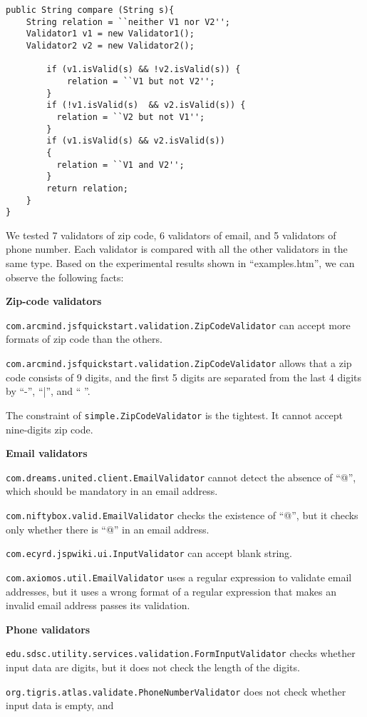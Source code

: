 \begin{verbatim}
public String compare (String s){		
    String relation = ``neither V1 nor V2'';
    Validator1 v1 = new Validator1();
    Validator2 v2 = new Validator2();

		if (v1.isValid(s) && !v2.isValid(s)) {
			relation = ``V1 but not V2'';
		} 
		if (!v1.isValid(s)	&& v2.isValid(s)) {
		  relation = ``V2 but not V1'';
		}
		if (v1.isValid(s) && v2.isValid(s))
		{
		  relation = ``V1 and V2'';
		}
		return relation;
	}
}
\end{verbatim}

We tested 7 validators of zip code, 6 validators of email, and 5 validators of phone number. Each validator is compared with all the other validators in the same type. Based on the experimental results shown in ``examples.htm'', we can observe the following facts:

{\bfseries Zip-code validators}

\verb|com.arcmind.jsfquickstart.validation.ZipCodeValidator| 
can accept more formats of zip code than the others. 

\verb|com.arcmind.jsfquickstart.validation.ZipCodeValidator| 
allows that a zip code consists of 9 digits, and the first 5 digits are separated from the last 4 digits by ``-'', ``|'', and `` ''.  

The constraint of 
\verb|simple.ZipCodeValidator| 
is the tightest. It cannot accept nine-digits zip code. 

{\bfseries  Email validators}

\verb|com.dreams.united.client.EmailValidator| 
cannot detect the absence of ``@'', which should be mandatory in an email address.

\verb|com.niftybox.valid.EmailValidator| 
checks the existence of ``@'', but it checks only whether there is ``@'' in an email address. 

\verb|com.ecyrd.jspwiki.ui.InputValidator| 
can accept blank string. 

\verb|com.axiomos.util.EmailValidator| 
uses a regular expression to validate email addresses, but it uses a wrong format of a regular expression that makes an invalid email address passes its validation.

{\bfseries  Phone validators}

\verb|edu.sdsc.utility.services.validation.FormInputValidator|  
checks whether input data are digits, but it does not check the length of the digits. 

\verb|org.tigris.atlas.validate.PhoneNumberValidator|
does not check whether input data is empty, and 

